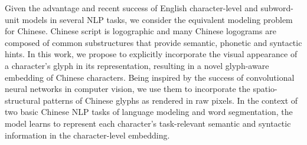 Given the advantage and recent success of English character-level and subword-unit models in several NLP tasks, we consider the equivalent modeling problem for Chinese. Chinese script is logographic and many Chinese logograms are composed of common substructures that provide semantic, phonetic and syntactic hints. In this work, we propose to explicitly incorporate the visual appearance of a character's glyph in its representation, resulting in a novel glyph-aware embedding of Chinese characters. Being inspired by the success of convolutional neural networks in computer vision, we use them to incorporate the spatio-structural patterns of Chinese glyphs as rendered in raw pixels. In the context of two basic Chinese NLP tasks of language modeling and word segmentation, the model learns to represent each character's task-relevant semantic and syntactic information in the character-level embedding.
